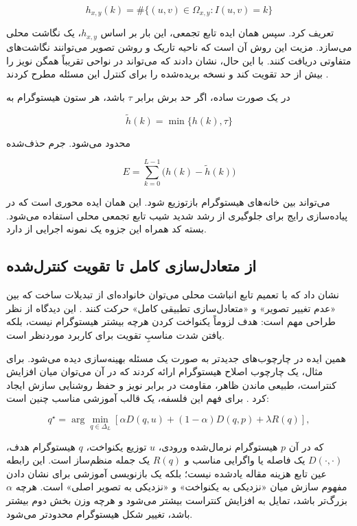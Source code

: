 \documentclass[12pt,a4paper]{article}
\begin{document}
\[
 h_{x,y}(k)=
 \#\{(u,v)\in\Omega_{x,y}: I(u,v)=k\}
\]

تعریف کرد. سپس همان ایده تابع تجمعی، این بار بر اساس $h_{x,y}$، یک نگاشت محلی می‌سازد.
مزیت این روش آن است که ناحیه تاریک و روشن تصویر می‌توانند نگاشت‌های متفاوتی دریافت
کنند. با این حال،  نشان دادند که  می‌تواند در نواحی تقریباً
همگن نویز را بیش از حد تقویت کند و نسخه بریده‌شده را برای کنترل این مسئله مطرح کردند
\cite{pizer1987}.

در یک صورت ساده، اگر حد برش برابر $\tau$ باشد، هر ستون هیستوگرام به

\[
 \widetilde h(k)=\min\{h(k),\tau\}
\]

محدود می‌شود. جرم حذف‌شده

\[
 E=\sum_{k=0}^{L-1}\bigl(h(k)-\widetilde h(k)\bigr)
\]

می‌تواند بین خانه‌های هیستوگرام بازتوزیع شود. این همان ایده محوری است که در پیاده‌سازی
رایج  برای جلوگیری از رشد شدید شیب تابع تجمعی محلی استفاده می‌شود. بسته کد
همراه این جزوه یک نمونه اجرایی از  دارد.

\subsection{از متعادل‌سازی کامل تا تقویت کنترل‌شده}

 نشان داد که با تعمیم تابع انباشت محلی می‌توان خانواده‌ای از تبدیلات ساخت که
بین «عدم تغییر تصویر» و «متعادل‌سازی تطبیقی کامل» حرکت کنند \cite{stark2000}. این دیدگاه
از نظر طراحی مهم است: هدف لزوماً یکنواخت کردن هرچه بیشتر هیستوگرام نیست، بلکه یافتن
شدت مناسبِ تقویت برای کاربرد موردنظر است.

همین ایده در چارچوب‌های جدیدتر به صورت یک مسئله بهینه‌سازی دیده می‌شود. برای مثال،
 یک چارچوب اصلاح هیستوگرام ارائه کردند که در آن می‌توان میان افزایش
کنتراست، طبیعی ماندن ظاهر، مقاومت در برابر نویز و حفظ روشنایی سازش ایجاد کرد
\cite{arici2009}. برای فهم این فلسفه، یک قالب آموزشی مناسب چنین است:

\[
 q^{\star}
 =
 \arg\min_{q\in\Delta_L}
 \left[
 \alpha D(q,u)
 +(1-\alpha)D(q,p)
 +\lambda R(q)
 \right],
\]

که در آن $p$ هیستوگرام نرمال‌شده ورودی، $u$ توزیع یکنواخت، $q$ هیستوگرام هدف،
$D(\cdot,\cdot)$ یک فاصله یا واگرایی مناسب و $R(q)$ یک جمله منظم‌ساز است. این رابطه
عین تابع هزینه مقاله یادشده نیست؛ بلکه یک بازنویسی آموزشی برای نشان دادن مفهوم سازش
میان «نزدیکی به یکنواخت» و «نزدیکی به تصویر اصلی» است. هرچه $\alpha$ بزرگ‌تر باشد،
تمایل به افزایش کنتراست بیشتر می‌شود و هرچه وزن بخش دوم بیشتر باشد، تغییر شکل
هیستوگرام محدودتر می‌شود.
\end{document}
